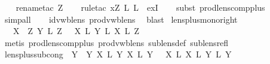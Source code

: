 \begin{isabellebody}
\ \ \isamarkupfalse%
\ {\isacharparenleft}rename{\isacharunderscore}tac\ Z{\isacharprime}{\isacharparenright}\isanewline
\ \ \isamarkupfalse%
\ {\isacharparenleft}rule{\isacharunderscore}tac\ x{\isacharequal}{\isachardoublequoteopen}Z{\isacharprime}\ {\isasymtimes}\isactrlsub L\ {}\isactrlsub L{\isachardoublequoteclose}\ \ exI{\isacharparenright}\isanewline
\ \ \isamarkupfalse%
\ {\isacharparenleft}subst\ prod{\isacharunderscore}lens{\isacharunderscore}comp{\isacharunderscore}plus{\isacharparenright}\isanewline
\ \ \isamarkupfalse%
\ {\isacharparenleft}simp{\isacharunderscore}all{\isacharparenright}\isanewline
\ \ \isamarkupfalse%
\ id{\isacharunderscore}vwb{\isacharunderscore}lens\ prod{\isacharunderscore}vwb{\isacharunderscore}lens\ \isamarkupfalse%
\ blast\isanewline
{}\isamarkupfalse%
%
\endisatagproof
{\isafoldproof}%
%
\isadelimproof
\isanewline
%
\endisadelimproof
\isanewline
{}\isamarkupfalse%
\ lens{\isacharunderscore}plus{\isacharunderscore}mono{\isacharunderscore}right{\isacharcolon}\isanewline
\ \ {\isachardoublequoteopen}{\isasymlbrakk}\ X\ {\isasymbowtie}\ Z{\isacharsemicolon}\ Y\ {\isasymsubseteq}\isactrlsub L\ Z\ {\isasymrbrakk}\ {\isasymLongrightarrow}\ X\ {\isacharplus}\isactrlsub L\ Y\ {\isasymsubseteq}\isactrlsub L\ X\ {\isacharplus}\isactrlsub L\ Z{\isachardoublequoteclose}\isanewline
%
\isadelimproof
\ \ %
\endisadelimproof
%
\isatagproof
{}\isamarkupfalse%
\ {\isacharparenleft}metis\ prod{\isacharunderscore}lens{\isacharunderscore}comp{\isacharunderscore}plus\ prod{\isacharunderscore}vwb{\isacharunderscore}lens\ sublens{\isacharunderscore}def\ sublens{\isacharunderscore}refl{\isacharparenright}%
\endisatagproof
{\isafoldproof}%
%
\isadelimproof
\isanewline
%
\endisadelimproof
\isanewline
{}\isamarkupfalse%
\ lens{\isacharunderscore}plus{\isacharunderscore}subcong{\isacharcolon}\ {\isachardoublequoteopen}{\isasymlbrakk}\ Y\ {\isasymbowtie}\ Y\ X\ {\isasymsubseteq}\isactrlsub L\ Y\ X\ {\isasymsubseteq}\isactrlsub L\ Y\ {\isasymrbrakk}\ {\isasymLongrightarrow}\ X\ {\isacharplus}\isactrlsub L\ X\ {\isasymsubseteq}\isactrlsub L\ Y\ {\isacharplus}\isactrlsub L\ Y\isanewline

\end{isabellebody}
